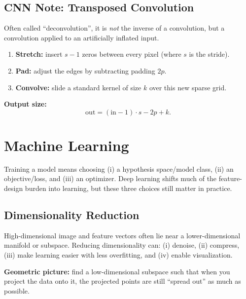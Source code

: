 \documentclass[11pt, oneside]{book}
\begin{document}
\section{CNN Note: Transposed Convolution}

\begin{thmbox}[title={Transposed Convolution (Learned Upsampling)}]
Often called ``deconvolution'', it is \emph{not} the inverse of a convolution, but a convolution applied to
an artificially inflated input.
\begin{enumerate}
  \item \textbf{Stretch:} insert $s-1$ zeros between every pixel (where $s$ is the stride).
  \item \textbf{Pad:} adjust the edges by subtracting padding $2p$.
  \item \textbf{Convolve:} slide a standard kernel of size $k$ over this new sparse grid.
\end{enumerate}
\textbf{Output size:}
\[
\text{out} = (\text{in}-1)\cdot s - 2p + k.
\]
\end{thmbox}


\chapter{Machine Learning}

Training a model means choosing (i) a hypothesis space/model class, (ii) an objective/loss,
and (iii) an optimizer. Deep learning shifts much of the feature-design burden into learning,
but these three choices still matter in practice.

\section{Dimensionality Reduction}

High-dimensional image and feature vectors often lie near a lower-dimensional manifold or subspace.
Reducing dimensionality can: (i) denoise, (ii) compress, (iii) make learning easier with less overfitting,
and (iv) enable visualization.

\begin{intbox}
\textbf{Geometric picture:} find a low-dimensional subspace such that when you project the data onto it,
the projected points are still ``spread out'' as much as possible.
\end{intbox}
\end{document}
